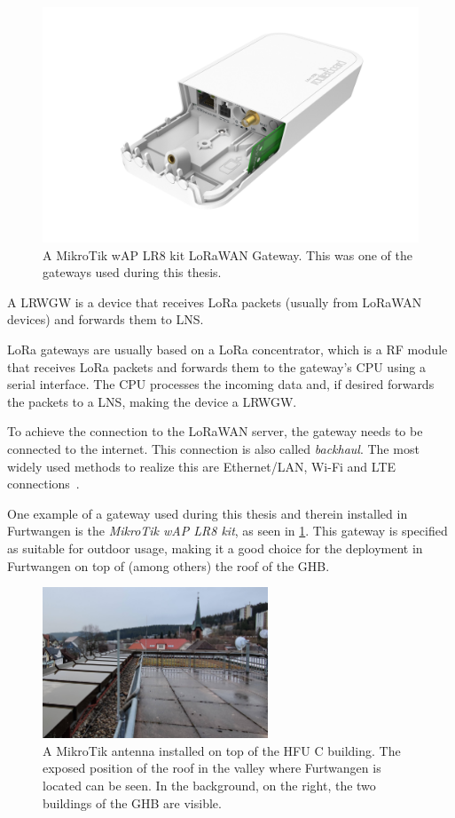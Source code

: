 \begin{figure}[htbp]
    \centering
    \includegraphics[width=.6\textwidth]{pictures/hardware/gateways/mikrotik-lr8-kit.png}
    \caption{
        A MikroTik wAP LR8 kit \ac{LoRaWAN} Gateway.
        This was one of the gateways used during this thesis.~\protect\cite{the_things_industries_bv_lorawan_nodate}
    }\label{pic:mikrotik-lr8-kit-gateway}
\end{figure}

A \acl{LRWGW} is a device that receives \ac{LoRa} packets (usually from \ac{LoRaWAN} devices) and forwards them to \ac{LNS}.

\ac{LoRa} gateways are usually based on a \ac{LoRa} concentrator, which is a \ac{RF} module that receives \ac{LoRa} packets and forwards them to the gateway's \ac{CPU} using a serial interface.
The \ac{CPU} processes the incoming data and, if desired forwards the packets to a \ac{LNS}, making the device a \acl{LRWGW}.

To achieve the connection to the \ac{LoRaWAN} server, the gateway needs to be connected to the internet.
This connection is also called \emph{backhaul}.
The most widely used methods to realize this are Ethernet/\ac{LAN}, Wi-Fi and \ac{LTE} connections~\cite{the_things_industries_bv_lorawan_nodate}.

One example of a gateway used during this thesis and therein installed in Furtwangen is the \emph{MikroTik wAP LR8 kit}, as seen in \cref{pic:mikrotik-lr8-kit-gateway}.
This gateway is specified as suitable for outdoor usage, making it a good choice for the deployment in Furtwangen on top of (among others) the roof of the \acf{GHB}.

\begin{figure}[htbp]
    \centering
    \includegraphics[width=0.6\textwidth]{pictures/hardware/gateway-deployment/mikrotik-antenna-c-building.jpg}
    \caption{
        A MikroTik antenna installed on top of the \ac{HFU} C building.
        The exposed position of the roof in the valley where Furtwangen is located can be seen.
        In the background, on the right, the two buildings of the \acf{GHB} are visible.
    }\label{pic:mikrotik-antenna-c-building}
\end{figure}

